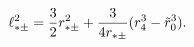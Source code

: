 \begin{equation}
\ell_{*\pm}^{2}={3\over 2}r_{*\pm}^{2}
+{3\over 4r_{*\pm}}(r_{4}^{3}-\tilde{r}_{0}^{3}).
\label{eq:last}
\end{equation}

